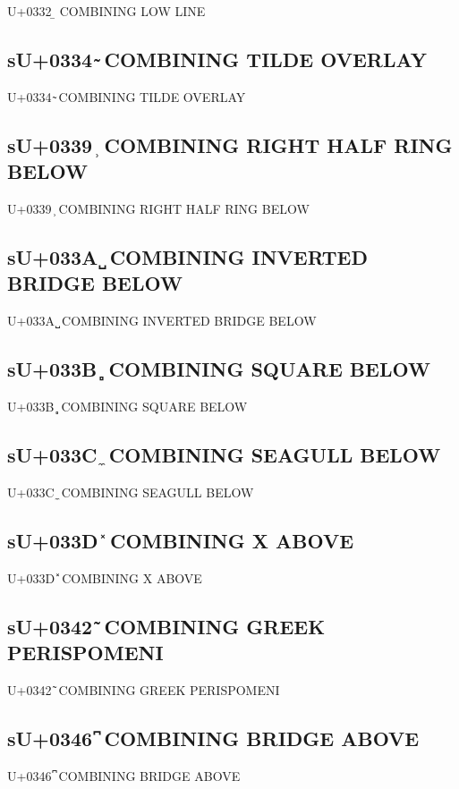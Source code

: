 U+0332 ̲ COMBINING LOW LINE

\subsection{sU+0334 ̴ COMBINING TILDE OVERLAY}

U+0334 ̴ COMBINING TILDE OVERLAY

\subsection{sU+0339 ̹ COMBINING RIGHT HALF RING BELOW}

U+0339 ̹ COMBINING RIGHT HALF RING BELOW

\subsection{sU+033A ̺ COMBINING INVERTED BRIDGE BELOW}

U+033A ̺ COMBINING INVERTED BRIDGE BELOW

\subsection{sU+033B ̻ COMBINING SQUARE BELOW}

U+033B ̻ COMBINING SQUARE BELOW

\subsection{sU+033C ̼ COMBINING SEAGULL BELOW}

U+033C ̼ COMBINING SEAGULL BELOW

\subsection{sU+033D ̽ COMBINING X ABOVE}

U+033D ̽ COMBINING X ABOVE

\subsection{sU+0342 ͂ COMBINING GREEK PERISPOMENI}

U+0342 ͂ COMBINING GREEK PERISPOMENI

\subsection{sU+0346 ͆ COMBINING BRIDGE ABOVE}

U+0346 ͆ COMBINING BRIDGE ABOVE

